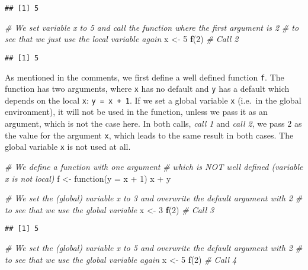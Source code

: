 \documentclass[11,]{article}
\newenvironment{Shaded}{\begin{snugshade}}{\end{snugshade}}
\newcommand{\KeywordTok}[1]{\textcolor[rgb]{0.13,0.29,0.53}{\textbf{{#1}}}}
\newcommand{\DataTypeTok}[1]{\textcolor[rgb]{0.13,0.29,0.53}{{#1}}}
\newcommand{\DecValTok}[1]{\textcolor[rgb]{0.00,0.00,0.81}{{#1}}}
\newcommand{\StringTok}[1]{\textcolor[rgb]{0.31,0.60,0.02}{{#1}}}
\newcommand{\CommentTok}[1]{\textcolor[rgb]{0.56,0.35,0.01}{\textit{{#1}}}}
\newcommand{\NormalTok}[1]{{#1}}
\begin{document}
\begin{verbatim}
## [1] 5
\end{verbatim}

\begin{Shaded}
\begin{Highlighting}[]
\CommentTok{# We set variable x to 5 and call the function where the first argument is 2}
\CommentTok{# to see that we just use the local variable again}
\NormalTok{x <-}\StringTok{ }\DecValTok{5}
\KeywordTok{f}\NormalTok{(}\DecValTok{2}\NormalTok{)  }\CommentTok{# Call 2}
\end{Highlighting}
\end{Shaded}

\begin{verbatim}
## [1] 5
\end{verbatim}

As mentioned in the comments, we first define a well defined function
\texttt{f}. The function has two arguments, where \texttt{x} has no
default and \texttt{y} has a default which depends on the local
\texttt{x}: \texttt{y\ =\ x\ +\ 1}. If we set a global variable
\texttt{x} (i.e.~in the global environment), it will not be used in the
function, unless we pass it as an argument, which is not the case here.
In both calls, \emph{call 1} and \emph{call 2}, we pass \(2\) as the
value for the argument \texttt{x}, which leads to the same result in
both cases. The global variable \texttt{x} is not used at all.

\begin{Shaded}
\begin{Highlighting}[]
\CommentTok{# We define a function with one argument}
\CommentTok{# which is NOT well defined (variable x is not local)}
\NormalTok{f <-}\StringTok{ }\NormalTok{function(}\DataTypeTok{y =} \NormalTok{x +}\StringTok{ }\DecValTok{1}\NormalTok{) x +}\StringTok{ }\NormalTok{y}

\CommentTok{# We set the (global) variable x to 3 and overwrite the default argument with 2}
\CommentTok{# to see that we use the global variable}
\NormalTok{x <-}\StringTok{ }\DecValTok{3}
\KeywordTok{f}\NormalTok{(}\DecValTok{2}\NormalTok{)  }\CommentTok{# Call 3}
\end{Highlighting}
\end{Shaded}

\begin{verbatim}
## [1] 5
\end{verbatim}

\begin{Shaded}
\begin{Highlighting}[]
\CommentTok{# We set the (global) variable x to 5 and overwrite the default argument with 2}
\CommentTok{# to see that we use the global variable again}
\NormalTok{x <-}\StringTok{ }\DecValTok{5}
\KeywordTok{f}\NormalTok{(}\DecValTok{2}\NormalTok{)  }\CommentTok{# Call 4}
\end{Highlighting}
\end{Shaded}
\end{document}
